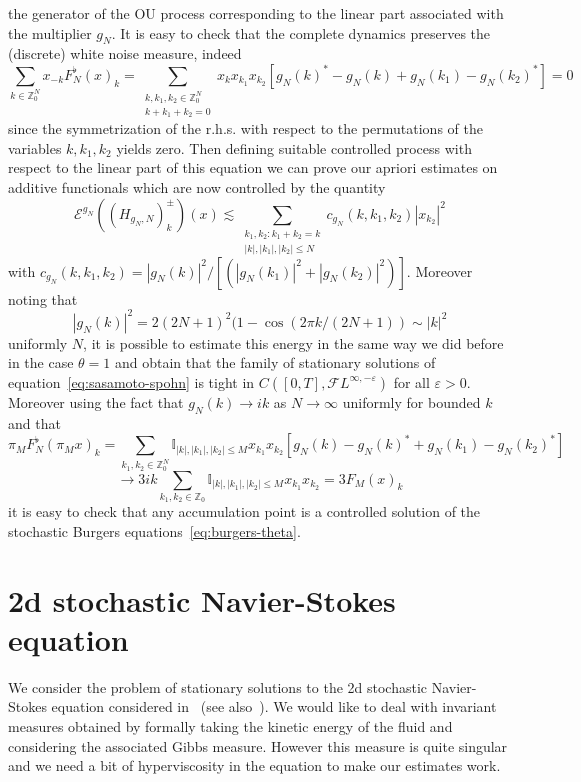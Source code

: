 \documentclass[11pt,a4paper,draft,reqno]{amsart}
\newcommand{\II}{\mathbb{I}}
\newcommand{\ZZ}{\mathbb{Z}}
\newcommand{\cE}{\mathcal{E}}
\newcommand{\cF}{\mathcal{F}}
\newcommand{\eps}{\varepsilon}
\begin{document}
the generator of the OU process corresponding to the linear part associated with the multiplier $g_N$. It is easy to check that the complete dynamics preserves the (discrete) white noise measure, indeed
$$
\sum_{k\in\ZZ_0^N} x_{-k} F^\flat_N(x)_k = \sum_{\substack{k,k_1,k_2\in\ZZ_0^N\\k+k_1+k_2=0}}  x_{k}  x_{k_1} x_{k_2}[ g_N(k)^*-g_N(k)+g_N(k_1)-g_N(k_2)^*] =0
$$
since the symmetrization of the r.h.s. with respect to the permutations of the variables $k,k_1,k_2$ yields zero. Then defining suitable controlled process with respect to the linear part of this equation we can prove our apriori estimates on additive functionals which are now controlled by the quantity
$$
 \cE^{g_N}((H_{g_N,N})^\pm_k)(x)\lesssim     \sum_{\substack{k_1,k_2 :k_1+k_2=k\\|k|,|k_1|,|k_2|\le N}}c_{g_N}(k,k_1,k_2) |x_{k_2}|^2  
$$
with $c_{g_N}(k,k_1,k_2) = |g_N(k)|^2/[(|g_N(k_1)|^{2}+|g_N(k_2)|^{2})]$. Moreover noting that
$$
|g_N(k)|^2 = 2 (2N+1)^2(1-\cos(2\pi k/(2N+1)) \sim |k|^2
$$
uniformly  $N$, it is possible to estimate this energy in the same way we did before in the case $\theta=1$ and obtain  that the family of stationary solutions of equation~\eqref{eq:sasamoto-spohn} is tight in $C([0,T],\cF L^{\infty,-\eps})$ for all $\eps >0$. Moreover using the fact that $g_N(k) \to ik$ as $N\to \infty$ uniformly for bounded $k$ and that 
$$
\pi_M F^\flat_N(\pi_M x)_k = \sum_{k_1,k_2\in\ZZ^N_0} \II_{|k|,|k_1|,|k_2|\le M}  x_{k_1} x_{k_2}[ g_N(k)-g_N(k)^*+g_N(k_1)-g_N(k_2)^*]
$$
$$
\to 3 i k \sum_{k_1,k_2\in\ZZ_0} \II_{|k|,|k_1|,|k_2|\le M}  x_{k_1} x_{k_2} = 3 F_M(x)_k
$$
it is easy to check that any accumulation point is a controlled solution of the stochastic Burgers equations~\eqref{eq:burgers-theta}. 

\section{2d stochastic Navier-Stokes equation}
\label{sec:ns}

We consider the problem of stationary solutions to the 2d stochastic Navier-Stokes equation considered in~\cite{albeverio-cruzeiro} (see also~\cite{albeverio-ferrario}). We would like to deal with invariant measures obtained by formally taking the kinetic energy of the fluid and considering the associated Gibbs measure. However this measure is quite singular and we need a bit of hyperviscosity in the equation to make our estimates work.
 
\end{document}
